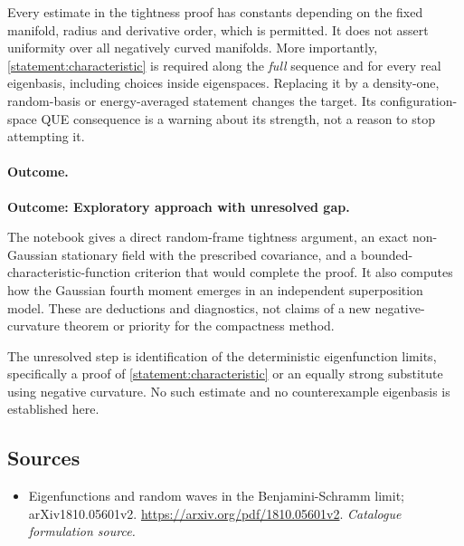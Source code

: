 \documentclass[11pt,a4paper]{article}
\numberwithin{equation}{section}
\begin{document}
Every estimate in the tightness proof has constants depending on the fixed
manifold, radius and derivative order, which is permitted. It does not
assert uniformity over all negatively curved manifolds. More importantly,
\eqref{statement:characteristic} is required along the \emph{full} sequence and
for every real eigenbasis, including choices inside eigenspaces. Replacing
it by a density-one, random-basis or energy-averaged statement changes the
target. Its configuration-space QUE consequence is a warning about its
strength, not a reason to stop attempting it.

\paragraph{Outcome.}
\textbf{Outcome: Exploratory approach with unresolved gap.}

The notebook gives a direct random-frame tightness argument, an exact
non-Gaussian stationary field with the prescribed covariance, and a
bounded-characteristic-function criterion that would complete the proof.
It also computes how the Gaussian fourth moment emerges in an independent
superposition model. These are deductions and diagnostics, not claims of
a new negative-curvature theorem or priority for the compactness method.

The unresolved step is identification of the deterministic eigenfunction
limits, specifically a proof of \eqref{statement:characteristic} or an equally
strong substitute using negative curvature. No such estimate and no
counterexample eigenbasis is established here.
\subsection{Sources}
\begin{itemize}\raggedright
\item[\textnormal{[S1]}]\hypertarget{source:statement:1}{} Eigenfunctions and random waves in the Benjamini-Schramm limit; arXiv1810.05601v2.
\url{https://arxiv.org/pdf/1810.05601v2}.
{\small\textit{Catalogue formulation source.}}
\end{itemize}
\end{document}
